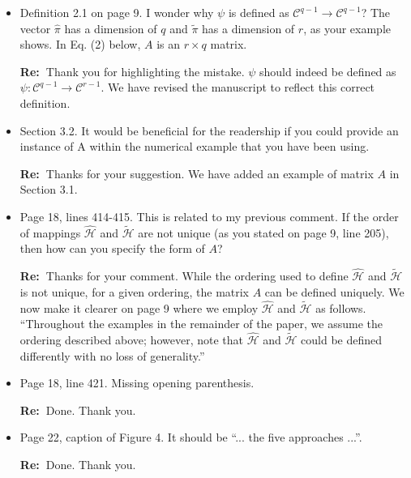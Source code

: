 \documentclass[11pt,a4paper]{article}
\newcommand{\RE}[2][Re:~]{{\color{blue}\textbf{#1}#2}}
\begin{document}
\begin{itemize}
    \item Definition 2.1 on page 9. I wonder why $\psi$ is defined as $\mathcal{C}^{q-1} \rightarrow \mathcal{C}^{q-1}$? The vector $\hat \pi$ has a dimension of $q$ and $\tilde{\pi}$ has a dimension of $r$, as your example shows. In Eq. (2) below, $A$ is an $r\times q$ matrix.
    
    \RE{Thank you for highlighting the mistake. $\psi$ should indeed be defined as $\psi: \mathcal{C}^{q-1} \rightarrow \mathcal{C}^{r-1}$. We have revised the manuscript to reflect this correct definition.}

    \item Section 3.2. It would be beneficial for the readership if you could provide an instance of A within the numerical example that you have been using.
    
    \RE{Thanks for your suggestion. We have added an example of matrix $A$ in Section 3.1.}

    \item Page 18, lines 414-415. This is related to my previous comment. If the order of mappings $\hat{\mathcal{H}}$ and $\tilde{\mathcal{H}}$ are not unique (as you stated on page 9, line 205), then how can you specify the form of $A$?
    
    \RE{Thanks for your comment. While the ordering used to define $\hat{\mathcal{H}}$ and $\tilde{\mathcal{H}}$ is not unique, for a given ordering, the matrix $A$ can be defined uniquely. We now make it clearer on page 9 where we employ $\hat{\mathcal{H}}$ and $\tilde{\mathcal{H}}$ as follows. ``Throughout the examples in the remainder of the paper, we assume the ordering described above; however, note that $\hat{\mathcal{H}}$ and $\tilde{\mathcal{H}}$ could be defined differently with no loss of generality.''}
    
    

    \item Page 18, line 421. Missing opening parenthesis.
    
    \RE{Done. Thank you.}
    \item Page 22, caption of Figure 4. It should be ``... the five approaches ...''.
    
    \RE{Done. Thank you.}
\end{itemize}


\newpage


% 
% 
\printbibliography
\end{document}
